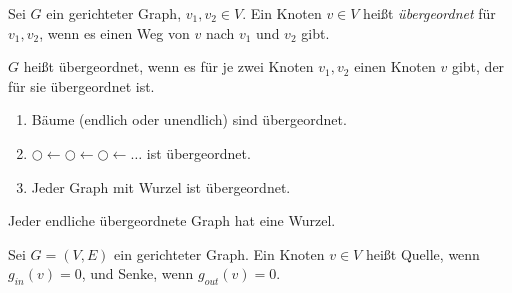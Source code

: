 \begin{definition}

	Sei $G$ ein gerichteter Graph, $v_1, v_2 \in V$. Ein Knoten $v \in V$ heißt \emph{übergeordnet} für $v_1, v_2$, wenn es einen Weg von $v$ nach $v_1$ und $v_2$ gibt.
	
	$G$ heißt übergeordnet, wenn es für je zwei Knoten $v_1, v_2$ einen Knoten $v$ gibt, der für sie übergeordnet ist.
	
	\begin{enumerate}
		\item Bäume (endlich oder unendlich) sind übergeordnet.
		\item $\bigcirc \leftarrow \bigcirc \leftarrow \bigcirc \leftarrow \dots$ ist übergeordnet.
		\item Jeder Graph mit Wurzel ist übergeordnet.
	\end{enumerate}
\end{definition}


\begin{bemerkung}
	Jeder endliche übergeordnete Graph hat eine Wurzel.
\end{bemerkung}


\begin{definition}

	Sei $G = (V,E)$ ein gerichteter Graph. Ein Knoten $v \in V$ heißt Quelle, wenn $g_{in}(v) = 0$, und Senke, wenn $g_{out}(v) = 0$.

\end{definition}